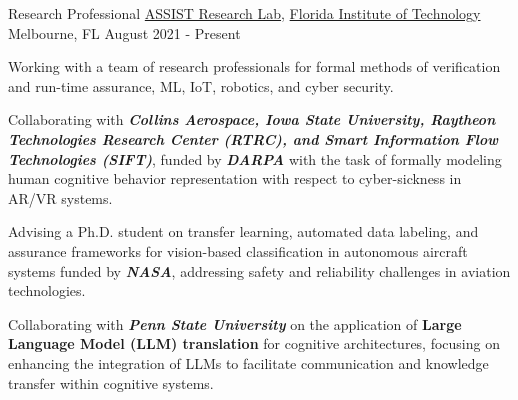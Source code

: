 


\begin{cventries}

\cventry
{Research Professional}
{\href{https://research.fit.edu/assist-lab/}{ASSIST Research Lab}, \href{www.fit.edu}{Florida Institute of Technology}}
{Melbourne, FL}
{August 2021 - Present}
{
\begin{cvitems}
\item Working with a team of research professionals for formal methods of verification and run-time assurance, ML, IoT, robotics, and cyber security.
\item Collaborating with \textit{\textbf{Collins Aerospace, Iowa State University, Raytheon Technologies Research Center (RTRC), and Smart Information Flow Technologies (SIFT)}}, funded by \textit{\textbf{DARPA}} with the task of formally modeling human cognitive behavior representation with respect to cyber-sickness in AR/VR systems. 
\item Advising a Ph.D. student on transfer learning, automated data labeling, and assurance frameworks for vision-based classification in autonomous aircraft systems funded by \textit{\textbf{NASA}}, addressing safety and reliability challenges in aviation technologies.
\item Collaborating with \textit{\textbf{Penn State University}} on the application of \textbf{Large Language Model (LLM) translation} for cognitive architectures, focusing on enhancing the integration of LLMs to facilitate communication and knowledge transfer within cognitive systems.

\end{cvitems}}
\end{cventries}
